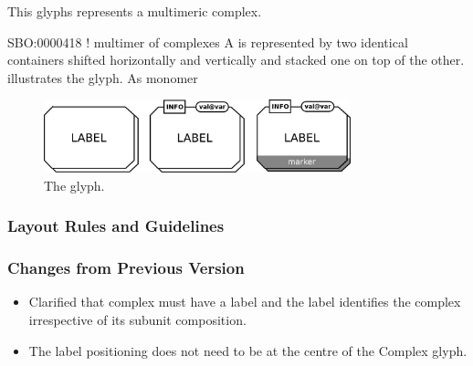 This glyphs represents a multimeric complex.

\begin{glyphDescription}

\glyphSboTerm SBO:0000418 ! multimer of complexes
\glyphContainer A  is represented by two
identical  containers shifted horizontally and
vertically and stacked one on top of the other.  
illustrates the glyph.
\glyphLabel As monomer
\end{glyphDescription}

\begin{figure}[htb]
  \centering
  \includegraphics[width = 3.5in]{images/complexMultimerGlyph}
  \caption{The  glyph.}
  \label{fig:techref:complexMultimer}
\end{figure}

\subsubsection{Layout Rules and Guidelines}

\begin{valrules}
\end{valrules}



\subsubsection{Changes from Previous Version}

\begin{itemize}
\item Clarified that complex must have a label and the label
  identifies the complex irrespective of its subunit composition.
\item The label positioning does not need to be at the centre of the
  Complex glyph.
\end{itemize}

